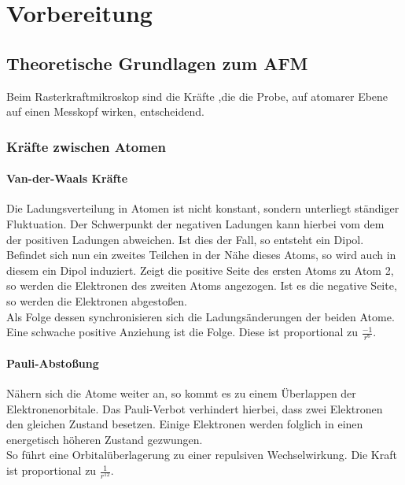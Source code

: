\chapter{Vorbereitung}

\section{Theoretische Grundlagen zum AFM}
       
Beim Rasterkraftmikroskop sind die Kräfte ,die die Probe, auf atomarer Ebene auf einen Messkopf wirken, entscheidend.

 \subsection{Kräfte zwischen Atomen}
        \subsubsection{Van-der-Waals Kräfte}

Die Ladungsverteilung in Atomen ist nicht konstant, sondern unterliegt ständiger 
Fluktuation. Der Schwerpunkt der negativen Ladungen kann hierbei vom dem der
positiven Ladungen abweichen. Ist dies der Fall, so entsteht ein Dipol. 
Befindet sich nun ein zweites Teilchen in der Nähe dieses Atoms, so wird auch
in diesem ein Dipol induziert. Zeigt die positive Seite des ersten Atoms zu Atom 2,
so werden die Elektronen des zweiten Atoms angezogen. Ist es die negative Seite, so
werden die Elektronen abgestoßen. 
\vspace{3pt}\\
Als Folge dessen synchronisieren sich die Ladungsänderungen der beiden Atome. Eine
schwache positive Anziehung ist die Folge. Diese ist proportional zu $\displaystyle
\frac{-1}{r^6}$.

        \subsubsection{Pauli-Abstoßung}

Nähern sich die Atome weiter an, so kommt es zu einem Überlappen der 
Elektronenorbitale. Das Pauli-Verbot verhindert hierbei, dass zwei Elektronen den
gleichen Zustand besetzen. Einige Elektronen werden folglich in einen energetisch
höheren Zustand gezwungen. \\
So führt eine Orbitalüberlagerung zu einer repulsiven Wechselwirkung. Die Kraft
ist proportional zu $\displaystyle \frac{1}{r^{12}}$.

